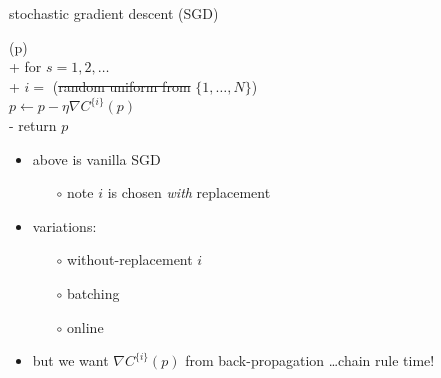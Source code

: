 \documentclass[xcolor={svgnames},
               hyperref={colorlinks,citecolor=DeepPink4,linkcolor=FireBrick,urlcolor=Maroon}]
               {beamer}
\newcommand{\grad}{\nabla}
\begin{document}
\begin{frame}{stochastic gradient descent (SGD)}


\begin{pseudo*}
(p)\text{:} \\+
    for $s = 1,2,\dots$ \\+
        $i=$ (\st{random uniform from} $\{1,\dots,N\}$) \\
        $p \gets p - \eta \grad C^{\{i\}}(p)$ \\-
    return $p$
\end{pseudo*}

\begin{itemize}
\item above is \alert{vanilla} SGD
    \begin{itemize}
    \item[$\circ$] note $i$ is chosen \emph{with} replacement
    \end{itemize}
\item variations:
    \begin{itemize}
    \item[$\circ$] without-replacement $i$
    \item[$\circ$] batching
    \item[$\circ$] \alert{online}
    \end{itemize}
\item but we want $\grad C^{\{i\}}(p)$ from back-propagation \dots chain rule time!
\end{itemize}

\end{frame}
\end{document}
